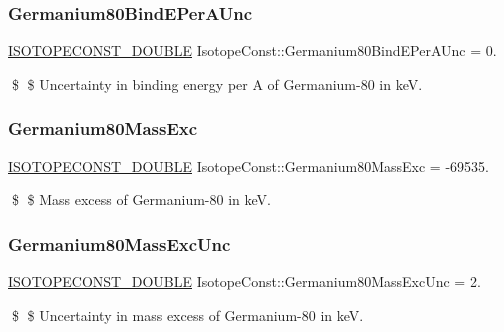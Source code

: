 \subsubsection{\texorpdfstring{Germanium80\+Bind\+E\+Per\+A\+Unc}{Germanium80BindEPerAUnc}}
{\footnotesize\ttfamily \mbox{\hyperlink{group___isotope_const-_macros_ga8f45a7272ce02c0b4c65c44636ed719a}{I\+S\+O\+T\+O\+P\+E\+C\+O\+N\+S\+T\+\_\+\+D\+O\+U\+B\+LE}} Isotope\+Const\+::\+Germanium80\+Bind\+E\+Per\+A\+Unc = 0.}

\$ \$ Uncertainty in binding energy per A of Germanium-\/80 in keV. \mbox{\label{group___isotope_const-_germanium-_ge80_ga290b2ed747a090a42b63787f47f57e7e}} 
\subsubsection{\texorpdfstring{Germanium80\+Mass\+Exc}{Germanium80MassExc}}
{\footnotesize\ttfamily \mbox{\hyperlink{group___isotope_const-_macros_ga8f45a7272ce02c0b4c65c44636ed719a}{I\+S\+O\+T\+O\+P\+E\+C\+O\+N\+S\+T\+\_\+\+D\+O\+U\+B\+LE}} Isotope\+Const\+::\+Germanium80\+Mass\+Exc = -\/69535.}

\$ \$ Mass excess of Germanium-\/80 in keV. \mbox{\label{group___isotope_const-_germanium-_ge80_gab86c2f0c45a2e62aa348d3e91589cafd}} 
\subsubsection{\texorpdfstring{Germanium80\+Mass\+Exc\+Unc}{Germanium80MassExcUnc}}
{\footnotesize\ttfamily \mbox{\hyperlink{group___isotope_const-_macros_ga8f45a7272ce02c0b4c65c44636ed719a}{I\+S\+O\+T\+O\+P\+E\+C\+O\+N\+S\+T\+\_\+\+D\+O\+U\+B\+LE}} Isotope\+Const\+::\+Germanium80\+Mass\+Exc\+Unc = 2.}

\$ \$ Uncertainty in mass excess of Germanium-\/80 in keV. \mbox{\label{group___isotope_const-_germanium-_ge80_ga18a61782457efbf7b955f4a72bcd85e3}} 

